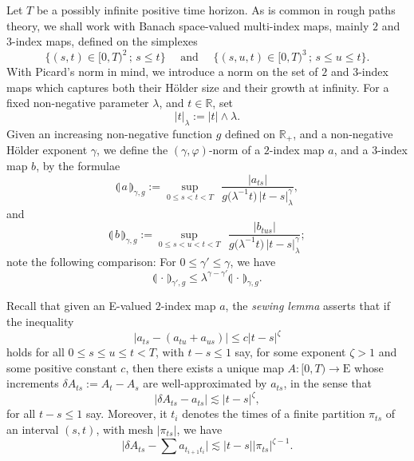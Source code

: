 \documentclass[11pt,a4paper]{amsart}
\newcommand{\RR}{\mathbb{R}}  \newcommand{\CC}{\mathbb{C}}  \newcommand{\LL}{\mathbb{L}}  \newcommand{\WW}{\mathbb{W}}
\renewcommand{\leq}{\leqslant}
\newcommand{\ssk}{\smallskip}
\numberwithin{equation}{section} %
\begin{document}
Let $T$ be a possibly infinite positive time horizon. As is common in rough paths theory, we shall work with Banach space-valued multi-index maps, mainly $2$ and $3$-index maps, defined on the simplexes
$$
\Big\{(s,t)\in [0,T)^2\,;\,s\leq t\Big\}\quad \textrm{ and } \quad \Big\{(s,u,t)\in [0,T)^3\,;\,s\leq u\leq t\Big\}.
$$
With Picard's norm in mind, we introduce a norm on the set of $2$ and $3$-index maps which captures both their H\"older size and their growth at infinity. For a fixed non-negative parameter $\lambda$, and $t\in\RR$, set
$$
|t|_\lambda := |t|\wedge\lambda.
$$
Given an increasing non-negative function $g$ defined on $\RR_+$, and a non-negative H\"older exponent $\gamma$, we define the $(\gamma,\varphi)$-norm of a $2$-index map $a$, and a $3$-index map $b$, by the formulae
$$
\llparenthesis\, a \,\rrparenthesis_{\gamma,g} := \underset{0\leq s<t<T}{\sup}\;\,\frac{\big| a_{ts}\big|}{g\big(\lambda^{-1} t\big)\,|t-s|_\lambda^\gamma},
$$
and 
$$
\llparenthesis\, b \,\rrparenthesis_{\gamma,g} := \underset{0\leq s< u<t<T}{\sup}\;\,\frac{\big| b_{tus}\big|}{g\big(\lambda^{-1} t\big)\,|t-s|_\lambda^\gamma};
$$
note the following comparison: For $0\leq \gamma'\leq \gamma$, we have
\begin{equation}
\label{EqComparisonNorms}
\llparenthesis\, \cdot \,\rrparenthesis_{\gamma',g} \leq \lambda^{\gamma-\gamma'} \llparenthesis\, \cdot \,\rrparenthesis_{\gamma,g}.
\end{equation}

\ssk

Recall that given an E-valued $2$-index map $a$, the \textit{sewing lemma} \cite{Gubinelli04, FdlP} asserts that if the inequality
\begin{equation}
\label{EqAlmostAdditivity}
\big| a_{ts} - (a_{tu}+a_{us})\big| \leq c|t-s|^\zeta
\end{equation}
holds for all $0\leq s\leq u\leq t<T$, with $t-s\leq 1$ say, for some exponent $\zeta>1$ and some positive constant $c$, then there exists a unique map $A : [0,T)\rightarrow \textrm{E}$ whose increments $\delta A_{ts} := A_t-A_s$ are well-approximated by $a_{ts}$, in the sense that 
$$
\big|\delta A_{ts} - a_{ts} \big| \lesssim |t-s|^\zeta,
$$
for all $t-s\leq 1$ say. Moreover, it $t_i$ denotes the times of a finite partition $\pi_{ts}$ of an interval $(s,t)$, with mesh $\big|\pi_{ts}\big|$, we have
\begin{equation}
\label{EqEstimateAlmostAdditiveFunctional}
\big|\delta A_{ts} - \sum a_{t_{i+1}t_i}\big| \lesssim |t-s|\big|\pi_{ts}\big|^{\zeta-1}.
\end{equation}
\end{document}
